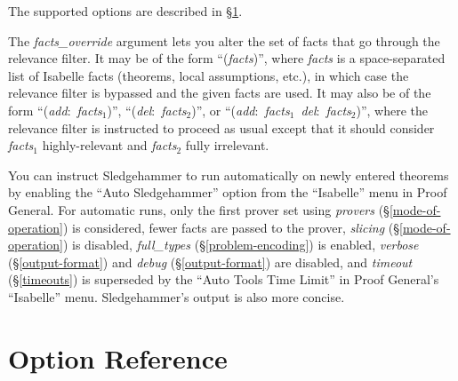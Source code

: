 \documentclass[a4paper,12pt]{article}
\begin{document}
The supported options are described in \S\ref{option-reference}.

The \textit{facts\_override} argument lets you alter the set of facts that go
through the relevance filter. It may be of the form ``(\textit{facts})'', where
\textit{facts} is a space-separated list of Isabelle facts (theorems, local
assumptions, etc.), in which case the relevance filter is bypassed and the given
facts are used. It may also be of the form ``(\textit{add}:\ \textit{facts}$_1$)'',
``(\textit{del}:\ \textit{facts}$_2$)'', or ``(\textit{add}:\ \textit{facts}$_1$\
\textit{del}:\ \textit{facts}$_2$)'', where the relevance filter is instructed to
proceed as usual except that it should consider \textit{facts}$_1$
highly-relevant and \textit{facts}$_2$ fully irrelevant.

You can instruct Sledgehammer to run automatically on newly entered theorems by
enabling the ``Auto Sledgehammer'' option from the ``Isabelle'' menu in Proof
General. For automatic runs, only the first prover set using \textit{provers}
(\S\ref{mode-of-operation}) is considered, fewer facts are passed to the prover,
\textit{slicing} (\S\ref{mode-of-operation}) is disabled, \textit{full\_types}
(\S\ref{problem-encoding}) is enabled, \textit{verbose} (\S\ref{output-format})
and \textit{debug} (\S\ref{output-format}) are disabled, and \textit{timeout}
(\S\ref{timeouts}) is superseded by the ``Auto Tools Time Limit'' in Proof
General's ``Isabelle'' menu. Sledgehammer's output is also more concise.

\section{Option Reference}
\label{option-reference}

\def\defl{\{}
\def\defr{\}}
\end{document}
